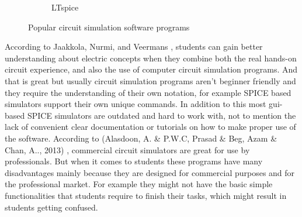 \documentclass[../main.tex]{subfiles}
\begin{document}
\begin{figure}[ht]
\begin{subfigure}{0.25\textwidth}
         \caption{LTspice}
         \label{fig:LTspice logo}
     \end{subfigure}
        \caption{Popular circuit simulation software programs}
        \label{fig:Logos of popular circuit simulation software programs}
\end{figure}
According to Jaakkola, Nurmi, and Veermans \cite{22}, students can gain better understanding about electric concepts when they combine both the real hands-on circuit experience, and also the use of computer circuit simulation programs. And that is great but usually circuit simulation programs aren’t beginner friendly and they require the understanding of their own notation, for example SPICE based simulators support their own unique commands. In addition to this most \acrshort{gui}-based SPICE simulators are outdated and hard to work with, not to mention the lack of convenient clear documentation or tutorials on how to make proper use of the software.
According to (Alasdoon, A. \& P.W.C, Prasad \& Beg, Azam \& Chan, A.., 2013) \cite{23}, commercial circuit simulators are great for use by professionals. But when it comes to students these programs have many disadvantages mainly because they are designed for commercial purposes and for the professional market. For example they might not have the basic simple functionalities that students require to finish their tasks, which might result in students getting confused. 
\end{document}
